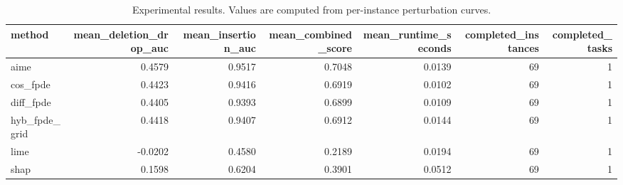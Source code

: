 \begin{table}[t]
\caption{Experimental results. Values are computed from per-instance perturbation curves.}
\label{tab:main_results_computed}
\centering
\begin{tabular}{lrrrrrr}
\toprule
method & mean\_deletion\_drop\_auc & mean\_insertion\_auc & mean\_combined\_score & mean\_runtime\_seconds & completed\_instances & completed\_tasks \\
\midrule
aime & 0.4579 & 0.9517 & 0.7048 & 0.0139 & 69 & 1 \\
cos\_fpde & 0.4423 & 0.9416 & 0.6919 & 0.0102 & 69 & 1 \\
diff\_fpde & 0.4405 & 0.9393 & 0.6899 & 0.0109 & 69 & 1 \\
hyb\_fpde\_grid & 0.4418 & 0.9407 & 0.6912 & 0.0144 & 69 & 1 \\
lime & -0.0202 & 0.4580 & 0.2189 & 0.0194 & 69 & 1 \\
shap & 0.1598 & 0.6204 & 0.3901 & 0.0512 & 69 & 1 \\
\bottomrule
\end{tabular}

\end{table}
